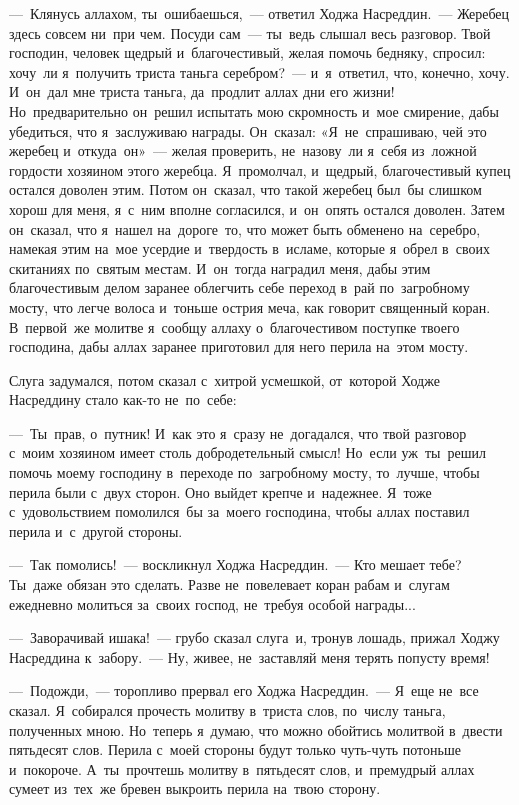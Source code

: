 \documentclass[12pt,a4paper]{book}
\begin{document}
—~Клянусь аллахом, ты~ошибаешься,~— ответил Ходжа Насреддин.~— Жеребец здесь совсем ни~при чем. Посуди сам~— ты~ведь слышал весь разговор. Твой господин, человек щедрый и~благочестивый, желая помочь бедняку, спросил: хочу~ли я~получить триста таньга серебром?~— и~я~ответил, что, конечно, хочу. И~он~дал мне триста таньга, да~продлит аллах дни его жизни! Но~предварительно он~решил испытать мою скромность и~мое смирение, дабы убедиться, что я~заслуживаю награды. Он~сказал: «Я~не~спрашиваю, чей это жеребец и~откуда~он»~— желая проверить, не~назову~ли я~себя из~ложной гордости хозяином этого жеребца. Я~промолчал, и~щедрый, благочестивый купец остался доволен этим. Потом он~сказал, что такой жеребец был~бы слишком хорош для меня, я~с~ним вполне согласился, и~он~опять остался доволен. Затем он~сказал, что я~нашел на~дороге~то, что может быть обменено на~серебро, намекая этим на~мое усердие и~твердость в~исламе, которые я~обрел в~своих скитаниях по~святым местам. И~он~тогда наградил меня, дабы этим благочестивым делом заранее облегчить себе переход в~рай по~загробному мосту, что легче волоса и~тоньше острия меча, как говорит священный коран. В~первой~же молитве я~сообщу аллаху о~благочестивом поступке твоего господина, дабы аллах заранее приготовил для него перила на~этом мосту.

Слуга задумался, потом сказал с~хитрой усмешкой, от~которой Ходже Насреддину стало как-то не~по~себе:

—~Ты~прав, о~путник! И~как это я~сразу не~догадался, что твой разговор с~моим хозяином имеет столь добродетельный смысл! Но~если уж~ты~решил помочь моему господину в~переходе по~загробному мосту, то~лучше, чтобы перила были с~двух сторон. Оно выйдет крепче и~надежнее. Я~тоже с~удовольствием помолился~бы за~моего господина, чтобы аллах поставил перила и~с~другой стороны.

—~Так помолись!~— воскликнул Ходжа Насреддин.~— Кто мешает тебе? Ты~даже обязан это сделать. Разве не~повелевает коран рабам и~слугам ежедневно молиться за~своих господ, не~требуя особой награды...

—~Заворачивай ишака!~— грубо сказал слуга~и, тронув лошадь, прижал Ходжу Насреддина к~забору.~— Ну, живее, не~заставляй меня терять попусту время!

—~Подожди,~— торопливо прервал его Ходжа Насреддин.~— Я~еще не~все сказал. Я~собирался прочесть молитву в~триста слов, по~числу таньга, полученных мною. Но~теперь я~думаю, что можно обойтись молитвой в~двести пятьдесят слов. Перила с~моей стороны будут только чуть-чуть потоньше и~покороче. А~ты~прочтешь молитву в~пятьдесят слов, и~премудрый аллах сумеет из~тех~же бревен выкроить перила на~твою сторону.
\end{document}
